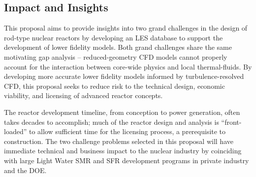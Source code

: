 



\vspace{-.25in}
\subsection{Impact and Insights}
\vspace{-.2in}

This proposal aims to provide insights into two grand challenges in the design
of rod-type nuclear reactors by developing an LES database to support the
development of lower fidelity models. Both grand challenges share the same
motivating gap analysis -- reduced-geometry CFD models cannot properly account
for the interaction between core-wide physics and local thermal-fluids. By
developing more accurate lower fidelity models informed by turbulence-resolved
CFD, this proposal seeks to reduce risk to the technical design, economic
viability, and licensing of advanced reactor concepts.

The reactor development timeline, from conception to power generation, often
takes decades to accomplish; much of the reactor design and analysis is
``front-loaded'' to allow sufficient time for the licensing process, a
prerequisite to construction. The two challenge problems selected in this
proposal will have immediate technical and business impact to the nuclear
industry by coinciding with large Light Water SMR and SFR development programs
in private industry and the DOE.

